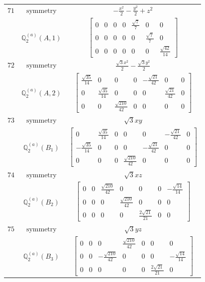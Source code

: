 \documentclass[fleqn,8pt,landscape]{jsarticle}
\begin{document}
\begin{longtable}{ccc}
$ 71 $ & $ \text{symmetry} $ & $ - \frac{x^{2}}{2} - \frac{y^{2}}{2} + z^{2} $ \\
$  $ & $ \mathbb{Q}_{2}^{(a)}(A,1) $ & $ \begin{bmatrix} 0 & 0 & 0 & 0 & \frac{\sqrt{7}}{7} & 0 & 0 \\ 0 & 0 & 0 & 0 & 0 & \frac{\sqrt{7}}{7} & 0 \\ 0 & 0 & 0 & 0 & 0 & 0 & \frac{\sqrt{42}}{14} \end{bmatrix} $ \\ \hline
$ 72 $ & $ \text{symmetry} $ & $ \frac{\sqrt{3} x^{2}}{2} - \frac{\sqrt{3} y^{2}}{2} $ \\
$  $ & $ \mathbb{Q}_{2}^{(a)}(A,2) $ & $ \begin{bmatrix} \frac{\sqrt{35}}{14} & 0 & 0 & 0 & - \frac{\sqrt{21}}{42} & 0 & 0 \\ 0 & \frac{\sqrt{35}}{14} & 0 & 0 & 0 & \frac{\sqrt{21}}{42} & 0 \\ 0 & 0 & \frac{\sqrt{210}}{42} & 0 & 0 & 0 & 0 \end{bmatrix} $ \\ \hline
$ 73 $ & $ \text{symmetry} $ & $ \sqrt{3} x y $ \\
$  $ & $ \mathbb{Q}_{2}^{(a)}(B_{1}) $ & $ \begin{bmatrix} 0 & \frac{\sqrt{35}}{14} & 0 & 0 & 0 & - \frac{\sqrt{21}}{42} & 0 \\ - \frac{\sqrt{35}}{14} & 0 & 0 & 0 & - \frac{\sqrt{21}}{42} & 0 & 0 \\ 0 & 0 & 0 & \frac{\sqrt{210}}{42} & 0 & 0 & 0 \end{bmatrix} $ \\ \hline
$ 74 $ & $ \text{symmetry} $ & $ \sqrt{3} x z $ \\
$  $ & $ \mathbb{Q}_{2}^{(a)}(B_{2}) $ & $ \begin{bmatrix} 0 & 0 & \frac{\sqrt{210}}{42} & 0 & 0 & 0 & - \frac{\sqrt{14}}{14} \\ 0 & 0 & 0 & \frac{\sqrt{210}}{42} & 0 & 0 & 0 \\ 0 & 0 & 0 & 0 & \frac{2 \sqrt{21}}{21} & 0 & 0 \end{bmatrix} $ \\ \hline
$ 75 $ & $ \text{symmetry} $ & $ \sqrt{3} y z $ \\
$  $ & $ \mathbb{Q}_{2}^{(a)}(B_{3}) $ & $ \begin{bmatrix} 0 & 0 & 0 & \frac{\sqrt{210}}{42} & 0 & 0 & 0 \\ 0 & 0 & - \frac{\sqrt{210}}{42} & 0 & 0 & 0 & - \frac{\sqrt{14}}{14} \\ 0 & 0 & 0 & 0 & 0 & \frac{2 \sqrt{21}}{21} & 0 \end{bmatrix} $ \\ \hline

\end{longtable}
\end{document}
